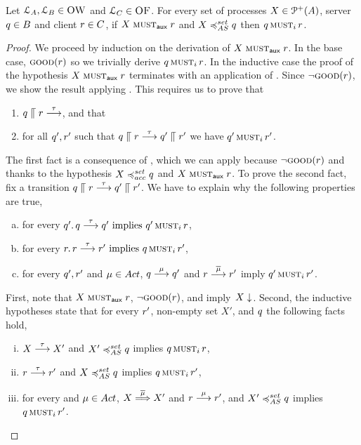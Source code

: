 \noindent%
\textbf{}
Let $\mathcal{L}_A, \mathcal{L}_B \in \textsc{OW}$ and
$\mathcal{L}_C \in \textsc{OF}$.
For every set of processes $X \in \mathcal{P}^{+}( A )$,
server $q \in B$ and client $r \in C$,
if $X \mathrel{\operatorname{\textsc{must}}_{\textsf{aux}}} r$ and $X \asleqset \serverB$ then
$q \operatorname{\textsc{must}}_i r$.
\begin{proof}
  We proceed by induction on the derivation of $X \mathrel{\operatorname{\textsc{must}}_{\textsf{aux}}} r$.
  In the base case, $\textsc{good}(r)$ so we trivially derive
  $q \operatorname{\textsc{must}}_i r$. %
  In the inductive case the proof of the hypothesis  $X \mathrel{\operatorname{\textsc{must}}_{\textsf{aux}}} r$
  terminates with an application of .
  Since $\lnot \textsc{good}(r)$, we show the result applying \mstep.
  This requires us to prove that
  \begin{enumerate}[(1)]
  \item $ q \mathrel{\llceil} r \mathrel{\overset{ \tau }\longrightarrow}$, and that
  \item for all $q', r'$ such that $q \mathrel{\llceil} r \mathrel{\overset{ \tau }\longrightarrow} q' \mathrel{\llceil} r' $
    we have $q' \operatorname{\textsc{must}}_i r' $.
  \end{enumerate}
  The first fact is a consequence of ,
  which we can apply because $\lnot \textsc{good}(r)$ and thanks to the
  hypothesis $X \accleqset q$ and $X \mathrel{\operatorname{\textsc{must}}_{\textsf{aux}}} r$.
  To prove the second fact, fix a transition $
  q \mathrel{\llceil} r \mathrel{\overset{ \tau }\longrightarrow} q' \mathrel{\llceil} r'$. We
  have to explain why the following properties are true,
  \begin{enumerate}[(a)]
  \item\label{pt:aim-soundness-1}
    for every
    $q' . \, q \mathrel{\overset{\tau}\longrightarrow} q' \text{ implies }
    q' \operatorname{\textsc{must}}_i r$,
  \item\label{pt:aim-soundness-2}
    for every
    $r . \, r \mathrel{\overset{\tau}\longrightarrow} r' \text{ implies }
    q \operatorname{\textsc{must}}_i r'$,
  \item\label{pt:aim-soundness-3}
    for every $q', r'$ and $\mu \in \Act$,
    $q \mathrel{\overset{\mu}\longrightarrow} q'$ and
    $r \mathrel{\overset{\overline{\mu}}\longrightarrow} r'$ imply
    $q' \operatorname{\textsc{must}}_i r'$.
  \end{enumerate}

  First, note that $X   \mathrel{\operatorname{\textsc{must}}_{\textsf{aux}}}  r$, $\lnot
  \textsc{good}(r)$, and  imply~$X \downarrow$. Second, the inductive hypotheses
  state that for every $r'$, non-empty set $X'$, and $q$ the following facts hold,
  \begin{enumerate}[(i)]
  \item\label{soundness-IH1}
    $X \mathrel{\overset{\tau}\longrightarrow} X'$ and $X' \asleqset \serverB$ implies
    $q \operatorname{\textsc{must}}_i r$,
  \item\label{soundness-IH2}
    $r \mathrel{\overset{\tau}\longrightarrow} r'$ and $X \asleqset \serverB$ implies
    $q \operatorname{\textsc{must}}_i r'$,
  \item\label{soundness-IH3}
    for every and $\mu \in \Act$,
    $X \mathrel{\overset{\overline{\mu}} \Longrightarrow} X'$ and $r \mathrel{\overset{\mu}\longrightarrow} r'$, and $X' \asleqset \serverB$ implies
    $q \operatorname{\textsc{must}}_i r'$.
  \end{enumerate}



\end{proof}

